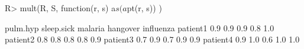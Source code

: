 \begin{Schunk}
% --begin: "comp.mult"
\begin{Sinput}
R> mult(R, S, function(r, s) {
       a$s(a$pt(r, s))
   })
\end{Sinput}
\begin{Soutput}
         pulm.hyp sleep.sick malaria hangover influenza
patient1      0.9        0.9     0.9      0.8       1.0
patient2      0.8        0.8     0.8      0.8       0.9
patient3      0.7        0.9     0.7      0.9       0.9
patient4      0.9        1.0     0.6      1.0       1.0
\end{Soutput}
%
% --end: "comp.mult"
\end{Schunk}
